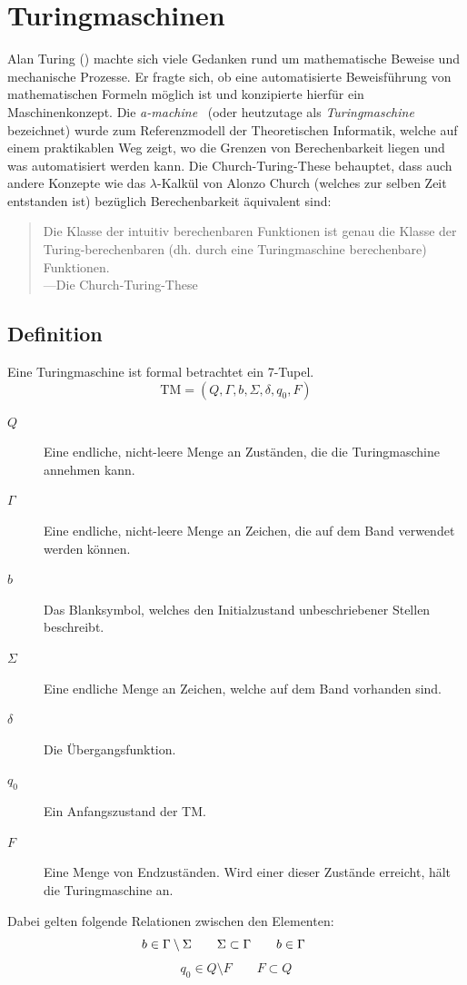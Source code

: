 \chapter{Turingmaschinen}
\label{sec:turingmachine}
\newcommand{\blank}{b}
%
Alan Turing () machte sich viele Gedanken rund um mathematische Beweise und mechanische Prozesse. Er fragte sich, ob eine automatisierte Beweisführung von mathematischen Formeln möglich ist und konzipierte hierfür ein Maschinenkonzept. Die \emph{a-machine}~\cite{Turing01011937} (oder heutzutage als \emph{Turingmaschine} bezeichnet) wurde zum Referenzmodell der Theoretischen Informatik, welche auf einem praktikablen Weg zeigt, wo die Grenzen von Berechenbarkeit liegen und was automatisiert werden kann. Die Church-Turing-These behauptet, dass auch andere Konzepte wie das $\lambda$-Kalkül von Alonzo Church (welches zur selben Zeit entstanden ist) bezüglich Berechenbarkeit äquivalent sind:
%
\begin{quotation}
 Die Klasse der intuitiv berechenbaren Funktionen ist genau die Klasse der Turing-berechenbaren (dh. durch eine Turingmaschine berechenbare) Funktionen. \\
 ---Die Church-Turing-These
\end{quotation}
%
\section{Definition}
%
Eine Turingmaschine ist formal betrachtet ein 7-Tupel.
\begin{equation}
  \text{TM} = (Q, \Gamma, \blank, \Sigma, \delta, q_0, F)
\end{equation}
%
\begin{description}
 \item[$Q$] Eine endliche, nicht-leere Menge an Zuständen, die die Turingmaschine annehmen kann.
 \item[$\Gamma$] Eine endliche, nicht-leere Menge an Zeichen, die auf dem Band verwendet werden können.
 \item[$\blank$] Das Blanksymbol, welches den Initialzustand unbeschriebener Stellen beschreibt.
 \item[$\Sigma$] Eine endliche Menge an Zeichen, welche auf dem Band vorhanden sind.
 \item[$\delta$] Die Übergangsfunktion.
 \item[$q_0$] Ein Anfangszustand der TM.
 \item[$F$] Eine Menge von Endzuständen. Wird einer dieser Zustände erreicht, hält die Turingmaschine an.
\end{description}
%
Dabei gelten folgende Relationen zwischen den Elementen:
\begin{displaymath}
  \blank \in \Gamma \setminus \Sigma  \qquad
  \Sigma \subset \Gamma  \mathspace  \blank \in \Gamma  \qquad
\end{displaymath}
\begin{displaymath}
  q_0 \in Q \setminus F \qquad
  F \subset Q
\end{displaymath}


